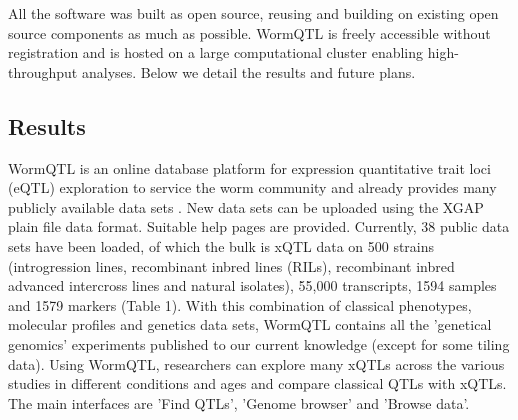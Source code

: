 All the software was built as open source, reusing and building on existing open source components 
as much as possible. WormQTL is freely accessible without registration and is hosted on a large 
computational cluster enabling high-throughput analyses. Below we detail the results and future plans.

\subsection{Results}
WormQTL is an online database platform for expression quantitative trait loci (eQTL) exploration 
to service the worm community and already provides many publicly available data sets \cite{Rockman:2010, 
Doroszuk:2009, Li:2006, Li:2010, Gutteling:2007, Vinuela:2010, Elvin:2011, Vinuela:2012}. New data 
sets can be uploaded using the XGAP plain file data format. Suitable help pages are provided. 
Currently, 38 public data sets have been loaded, of which the bulk is xQTL data on 500 strains 
(introgression lines, recombinant inbred lines (RILs), recombinant inbred advanced intercross lines 
and natural isolates), 55,000 transcripts, 1594 samples and 1579 markers (Table 1). With this 
combination of classical phenotypes, molecular profiles and genetics data sets, WormQTL contains 
all the 'genetical genomics' experiments published to our current knowledge (except for some tiling 
data). Using WormQTL, researchers can explore many xQTLs across the various studies in different 
conditions and ages and compare classical QTLs with xQTLs. The main interfaces are 'Find QTLs', 
'Genome browser' and 'Browse data'.

